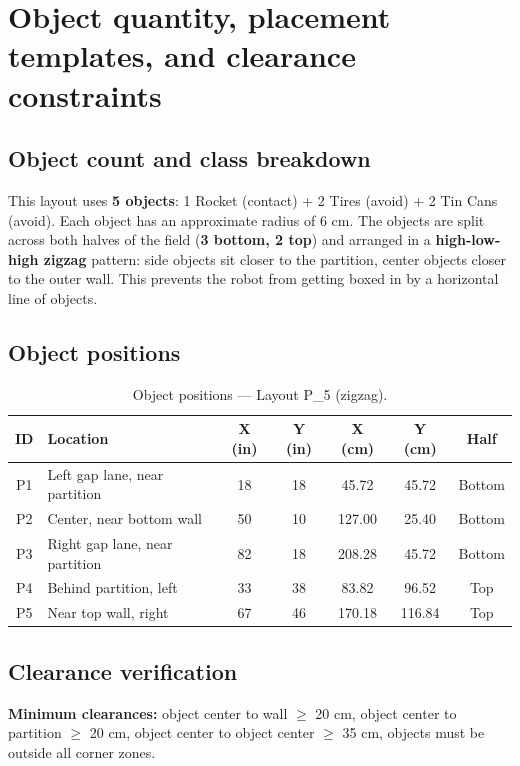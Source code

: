 \documentclass[a4]{article}
\begin{document}
\section*{Object quantity, placement templates, and clearance constraints}
\subsection*{Object count and class breakdown}
This layout uses \textbf{5 objects}: 1 Rocket (contact) + 2 Tires (avoid) + 2 Tin Cans (avoid). Each object has an approximate radius of 6 cm. The objects are split across both halves of the field (\textbf{3 bottom, 2 top}) and arranged in a \textbf{high-low-high zigzag} pattern: side objects sit closer to the partition, center objects closer to the outer wall. This prevents the robot from getting boxed in by a horizontal line of objects.

\subsection*{Object positions}

\begin{table}[H]
\centering
\begin{tabular}{clccccc}
\toprule
\textbf{ID} & \textbf{Location} & \textbf{X (in)} & \textbf{Y (in)} & \textbf{X (cm)} & \textbf{Y (cm)} & \textbf{Half} \\
\midrule
P1 & Left gap lane, near partition & 18 & 18 & 45.72 & 45.72 & Bottom \\
P2 & Center, near bottom wall & 50 & 10 & 127.00 & 25.40 & Bottom \\
P3 & Right gap lane, near partition & 82 & 18 & 208.28 & 45.72 & Bottom \\
P4 & Behind partition, left & 33 & 38 & 83.82 & 96.52 & Top \\
P5 & Near top wall, right & 67 & 46 & 170.18 & 116.84 & Top \\
\bottomrule
\end{tabular}
\caption{Object positions --- Layout P\_5 (zigzag).}
\end{table}

\subsection*{Clearance verification}

\textbf{Minimum clearances:} object center to wall $\geq$ 20 cm, object center to partition $\geq$ 20 cm, object center to object center $\geq$ 35 cm, objects must be outside all corner zones.
\end{document}
